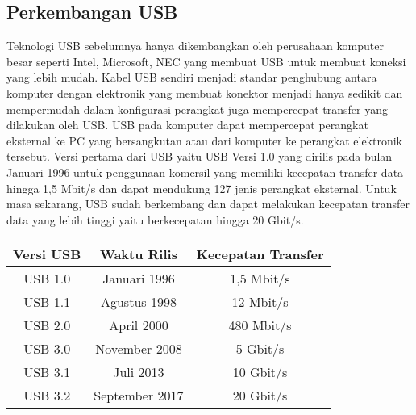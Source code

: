 \subsection{Perkembangan USB}
Teknologi USB sebelumnya hanya dikembangkan oleh perusahaan komputer besar seperti Intel, Microsoft, NEC yang membuat USB untuk membuat koneksi yang lebih mudah. Kabel USB sendiri menjadi standar penghubung antara komputer dengan elektronik yang membuat konektor menjadi hanya sedikit dan mempermudah dalam konfigurasi perangkat juga mempercepat transfer yang dilakukan oleh USB. USB pada komputer dapat mempercepat perangkat eksternal ke PC yang bersangkutan atau dari komputer ke perangkat elektronik tersebut.
\break
Versi pertama dari USB yaitu USB Versi 1.0 yang dirilis pada bulan Januari 1996 untuk penggunaan komersil yang memiliki kecepatan transfer data hingga 1,5 Mbit/s dan dapat mendukung 127 jenis perangkat eksternal. Untuk masa sekarang, USB sudah berkembang dan dapat 
melakukan kecepatan transfer data yang lebih tinggi yaitu berkecepatan hingga 20 Gbit/s.
\break
\begin{center}
\begin{tabular}{||c c c||} 
\hline
Versi USB & Waktu Rilis & Kecepatan Transfer \\ [0.5ex] 
\hline\hline
USB 1.0 & Januari 1996 & 1,5 Mbit/s\\ 
\hline
USB 1.1 & Agustus 1998 & 12 Mbit/s\\
\hline
USB 2.0 & April 2000 & 480 Mbit/s\\
\hline
USB 3.0 & November 2008 & 5 Gbit/s \\
\hline
USB 3.1 & Juli 2013 & 10 Gbit/s \\
\hline
USB 3.2 & September 2017 & 20 Gbit/s\\ [1ex] 
\hline
\end{tabular}
\end{center}

